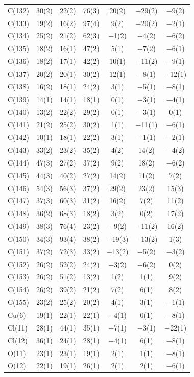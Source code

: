 \begin{center}
{\begin{supertabular}{lcccccc}
C(132)&30(2) &22(2)&76(3) &20(2)&$-$29(2) &$-$9(2)\\
C(133)&19(2) &16(2)&97(4) &9(2)&$-$20(2) &$-$2(1)\\
C(134)&25(2) &21(2)&62(3) &$-$1(2)&$-$4(2) &$-$6(2)\\
C(135)&18(2) &16(1)&47(2) &5(1)&$-$7(2) &$-$6(1)\\
C(136)&18(2) &17(1)&42(2) &10(1)&$-$11(2) &$-$9(1)\\
C(137)&20(2) &20(1)&30(2) &12(1)&$-$8(1) &$-$12(1)\\
C(138)&16(2) &18(1)&24(2) &3(1)&$-$5(1) &$-$8(1)\\
C(139)&14(1) &14(1)&18(1) &0(1)&$-$3(1) &$-$4(1)\\
C(140)&13(2) &22(2)&29(2) &0(1)&$-$3(1) &0(1)\\
C(141)&21(2) &25(2)&30(2) &1(1)&$-$11(1) &$-$6(1)\\
C(142)&10(1) &18(1)&22(2) &3(1)&$-$1(1) &$-$2(1)\\
C(143)&33(2) &23(2)&35(2) &4(2)&14(2) &$-$4(2)\\
C(144)&47(3) &27(2)&37(2) &9(2)&18(2) &$-$6(2)\\
C(145)&44(3) &40(2)&27(2) &14(2)&11(2) &7(2)\\
C(146)&54(3) &56(3)&37(2) &29(2)&23(2) &15(3)\\
C(147)&37(3) &60(3)&31(2) &16(2)&7(2) &11(2)\\
C(148)&36(2) &68(3)&18(2) &3(2)&0(2) &17(2)\\
C(149)&38(3) &76(4)&23(2) &$-$9(2)&$-$11(2) &16(2)\\
C(150)&34(3) &93(4)&38(2) &$-$19(3)&$-$13(2) &1(3)\\
C(151)&37(2) &72(3)&33(2) &$-$13(2)&$-$5(2) &$-$3(2)\\
C(152)&26(2) &52(2)&24(2) &$-$3(2)&$-$6(2) &0(2)\\
C(153)&26(2) &51(2)&13(2) &1(2)&1(1) &9(2)\\
C(154)&26(2) &39(2)&21(2) &7(2)&6(1) &8(2)\\
C(155)&23(2) &25(2)&20(2) &4(1)&3(1) &$-$1(1)\\
Cu(6)&19(1) &22(1)&22(1) &$-$4(1)&0(1) &$-$8(1)\\
Cl(11)&28(1) &44(1)&35(1) &$-$7(1)&$-$3(1) &$-$22(1)\\
Cl(12)&36(1) &24(1)&28(1) &$-$4(1)&6(1) &$-$8(1)\\
O(11)&23(1) &23(1)&19(1) &2(1)&1(1) &$-$8(1)\\
O(12)&22(1) &19(1)&26(1) &2(1)&2(1) &$-$6(1)\\

\end{supertabular}}
\end{center}
